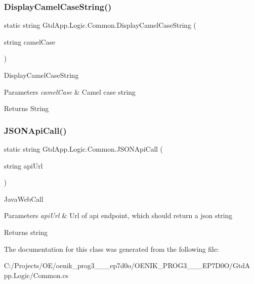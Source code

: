 \subsubsection{\texorpdfstring{Display\+Camel\+Case\+String()}{DisplayCamelCaseString()}}
{\footnotesize\ttfamily static string Gtd\+App.\+Logic.\+Common.\+Display\+Camel\+Case\+String (\begin{DoxyParamCaption}\item[{string}]{camel\+Case }\end{DoxyParamCaption})\hspace{0.3cm}{\ttfamily [static]}}



Display\+Camel\+Case\+String 


\begin{DoxyParams}{Parameters}
{\em camel\+Case} & Camel case string\\
\hline
\end{DoxyParams}
\begin{DoxyReturn}{Returns}
String
\end{DoxyReturn}
\mbox{\label{class_gtd_app_1_1_logic_1_1_common_ad099da96a07128224d8f137fa366d693}} 
\subsubsection{\texorpdfstring{J\+S\+O\+N\+Api\+Call()}{JSONApiCall()}}
{\footnotesize\ttfamily static string Gtd\+App.\+Logic.\+Common.\+J\+S\+O\+N\+Api\+Call (\begin{DoxyParamCaption}\item[{string}]{api\+Url }\end{DoxyParamCaption})\hspace{0.3cm}{\ttfamily [static]}}



Java\+Web\+Call 


\begin{DoxyParams}{Parameters}
{\em api\+Url} & Url of api endpoint, which should return a json string\\
\hline
\end{DoxyParams}
\begin{DoxyReturn}{Returns}
string
\end{DoxyReturn}


The documentation for this class was generated from the following file\+:\begin{DoxyCompactItemize}
\item 
C\+:/\+Projects/\+O\+E/oenik\+\_\+prog3\+\_\+\_\+\_\+ep7d0o/\+O\+E\+N\+I\+K\+\_\+\+P\+R\+O\+G3\+\_\+\_\+\_\+\+E\+P7\+D0\+O/\+Gtd\+App.\+Logic/Common.\+cs\end{DoxyCompactItemize}
